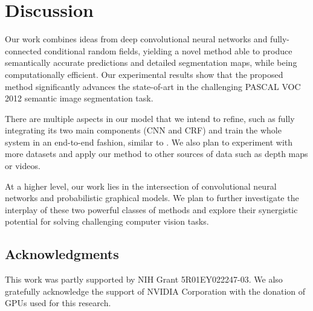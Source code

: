 \section{Discussion}
\label{sec:discussion}

Our work combines ideas from deep convolutional neural networks and
fully-connected conditional random fields, yielding a novel method able to
produce semantically accurate predictions and detailed segmentation maps,
while being computationally efficient. Our experimental results show that the
proposed method significantly advances the state-of-art in the challenging
PASCAL VOC 2012 semantic image segmentation task.

There are multiple aspects in our model that we intend to refine, such as
fully integrating its two main components (CNN and CRF) and train the whole
system in an end-to-end fashion, similar to \citet{Koltun13, chen2014learning}.
We also plan to experiment with more datasets and apply our method to other 
sources of data such as depth maps or videos.

At a higher level, our work lies in the intersection of convolutional neural
networks and probabilistic graphical models. We plan to further investigate
the interplay of these two powerful classes of methods and explore their
synergistic potential for solving challenging computer vision tasks.

\subsection*{Acknowledgments} 

This work was partly supported by NIH Grant 5R01EY022247-03. We also
gratefully acknowledge the support of NVIDIA Corporation with the
donation of GPUs used for this research.
